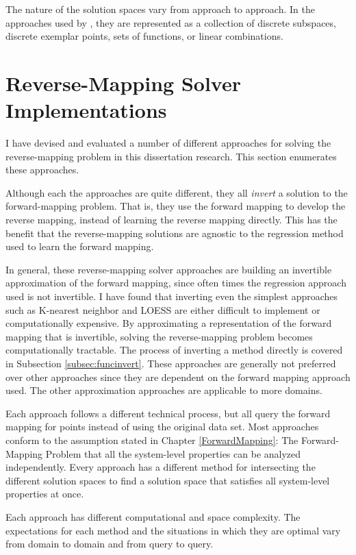 The nature of the solution spaces vary from approach to approach.
In the approaches used by \fw, they are represented as a collection of discrete subspaces, discrete exemplar points, sets of functions, or linear combinations.

\section{Reverse-Mapping Solver Implementations}

I have devised and evaluated a number of different approaches for solving the reverse-mapping problem in this dissertation research.
This section enumerates these approaches.

Although each the approaches are quite different, they all \textit{invert} a solution to the forward-mapping problem.
That is, they use the forward mapping to develop the reverse mapping, instead of learning the reverse mapping directly.
This has the benefit that the reverse-mapping solutions are agnostic to the regression method used to learn the forward mapping.

In general, these reverse-mapping solver approaches are building an invertible approximation of the forward mapping, since often times the regression approach used is not invertible.
I have found that inverting even the simplest approaches such as K-nearest neighbor and LOESS are either difficult to implement or computationally expensive.
By approximating a representation of the forward mapping that is invertible, solving the reverse-mapping problem becomes computationally tractable.
The process of inverting a method directly is covered in Subsection \ref{subsec:funcinvert}.
These approaches are generally not preferred over other approaches since they are dependent on the forward mapping approach used.
The other approximation approaches are applicable to more domains.

Each approach follows a different technical process, but all query the forward mapping for points instead of using the original data set.
Most approaches conform to the assumption stated in Chapter \ref{ForwardMapping}: The Forward-Mapping Problem that all the system-level properties can be analyzed independently.
Every approach has a different method for intersecting the different solution spaces to find a solution space that satisfies all system-level properties at once.

Each approach has different computational and space complexity.
The expectations for each method and the situations in which they are optimal vary from domain to domain and from query to query.

